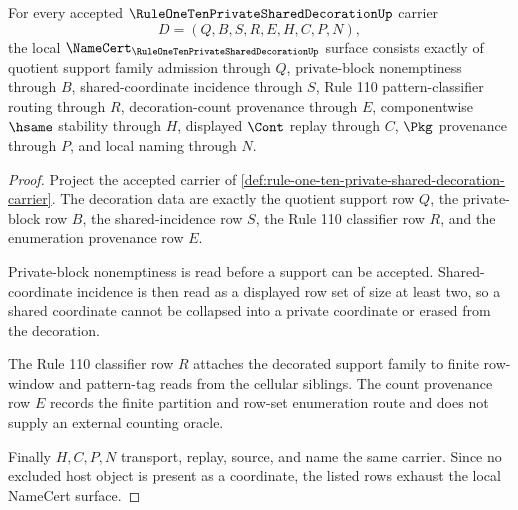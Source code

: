 \begin{theorem}
\label{thm:rule-one-ten-private-shared-decoration-namecert-obligations}
For every accepted $\RuleOneTenPrivateSharedDecorationUp$ carrier
$$
D=(Q,B,S,R,E,H,C,P,N),
$$
the local $\NameCert_{\RuleOneTenPrivateSharedDecorationUp}$ surface consists exactly of quotient support family admission through $Q$, private-block nonemptiness through $B$, shared-coordinate incidence through $S$, Rule 110 pattern-classifier routing through $R$, decoration-count provenance through $E$, componentwise $\hsame$ stability through $H$, displayed $\Cont$ replay through $C$, $\Pkg$ provenance through $P$, and local naming through $N$.
\end{theorem}
\begin{proof}
Project the accepted carrier of \autoref{def:rule-one-ten-private-shared-decoration-carrier}. The decoration data are exactly the quotient support row $Q$, the private-block row $B$, the shared-incidence row $S$, the Rule 110 classifier row $R$, and the enumeration provenance row $E$.

Private-block nonemptiness is read before a support can be accepted. Shared-coordinate incidence is then read as a displayed row set of size at least two, so a shared coordinate cannot be collapsed into a private coordinate or erased from the decoration.

The Rule 110 classifier row $R$ attaches the decorated support family to finite row-window and pattern-tag reads from the cellular siblings. The count provenance row $E$ records the finite partition and row-set enumeration route and does not supply an external counting oracle.

Finally $H,C,P,N$ transport, replay, source, and name the same carrier. Since no excluded host object is present as a coordinate, the listed rows exhaust the local NameCert surface.
\end{proof}

